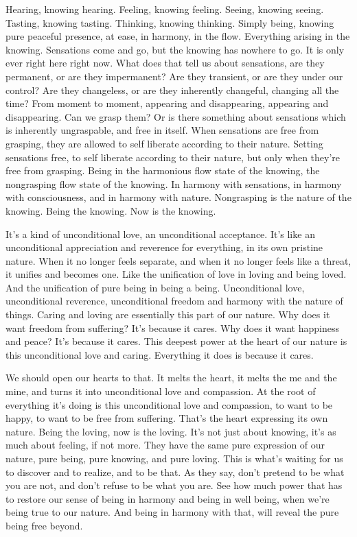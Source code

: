 \documentclass[12pt,openany]{book}
\begin{document}
Hearing, knowing hearing. Feeling, knowing feeling. Seeing, knowing seeing. Tasting, knowing tasting. Thinking, knowing \linebreak thinking. Simply being, knowing pure peaceful presence, at ease, in harmony, in the flow. Everything arising in the knowing. Sensations come and go, but the knowing has nowhere to go. It is only ever right here right now. What does that tell us about sensations, are they permanent, or are they impermanent? Are they transient, or are they under our control? Are they changeless, or are they inherently changeful, changing all the time? From moment to moment, appearing and disappearing, appearing and disappearing. Can we grasp them? Or is there something about sensations which is inherently ungraspable, and free in itself. \linebreak When sensations are free from grasping, they are allowed to self liberate according to their nature. Setting sensations free, to self liberate according to their nature, but only when they’re free from grasping. Being in the harmonious flow state of the knowing, the nongrasping flow state of the knowing. In harmony with sensations, in harmony with consciousness, and in harmony with nature. Nongrasping is the nature of the knowing. Being the knowing. Now is the knowing.

It's a kind of unconditional love, an unconditional acceptance. It's like an unconditional appreciation and reverence for everything, in its own pristine nature. When it no longer feels separate, and when it no longer feels like a threat, it unifies and becomes one. Like the unification of love in loving and being loved. And the unification of pure being in being a being. Unconditional love, unconditional reverence, unconditional freedom and harmony with the nature of things. Caring and loving are essentially this part of our nature. Why does it want freedom from suffering? It's because it cares. Why does it want happiness and peace? It's because it cares. This deepest power at the heart of our nature is this unconditional love and caring. Everything it does is because it cares.

We should open our hearts to that. It melts the heart, it melts the me and the mine, and turns it into unconditional love and compassion. At the root of everything it's doing is this unconditional love and compassion, to want to be happy, to want to be free from suffering. That's the heart expressing its own nature. Being the loving, now is the loving. It’s not just about knowing, it's as much about feeling, if not more. They have the same pure expression of our nature, pure being, pure knowing, and pure loving. This is what's waiting for us to discover and to realize, and to be that. As they say, don't pretend to be what you are not, and don't refuse to be what you are. See how much power that has to restore our sense of being in harmony and being in well being, when we're being true to our nature. And being in harmony with that, will reveal the pure being free beyond.
\end{document}
